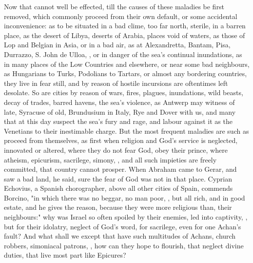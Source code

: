 Now that cannot well be effected, till the causes of these maladies be first
removed, which commonly proceed from their own default, or some accidental
inconvenience: as to be situated in a bad clime, too far north, sterile, in a
barren place, as the desert of Libya, deserts of Arabia, places void of waters,
as those of Lop and Belgian in Asia, or in a bad air, as at Alexandretta,
Bantam, Pisa, Durrazzo, S. John de Ulloa, \etc{}, or in danger of the sea's
continual inundations, as in many places of the Low Countries and elsewhere, or
near some bad neighbours, as Hungarians to Turks, Podolians to Tartars, or
almost any bordering countries, they live in fear still, and by reason of
hostile incursions are oftentimes left desolate. So are cities by reason
of wars, fires, plagues, inundations,
wild beasts, decay of trades, barred havens, the sea's
violence, as Antwerp may witness of late, Syracuse of old, Brundusium in Italy,
Rye and Dover with us, and many that at this day suspect the sea's fury and
rage, and labour against it as the Venetians to their inestimable charge. But
the most frequent maladies are such as proceed from themselves, as first when
religion and God's service is neglected, innovated or altered, where they do
not fear God, obey their prince, where atheism, epicurism, sacrilege, simony,
\etc{}, and all such impieties are freely committed, that country cannot
prosper. When Abraham came to Gerar, and saw a bad land, he said, sure the fear
of God was not in that place. Cyprian Echovius, a Spanish
chorographer, above all other cities of Spain, commends Borcino, "in which
there was no beggar, no man poor, \etc{}, but all rich, and in good estate, and
he gives the reason, because they were more religious than, their neighbours:"
why was Israel so often spoiled by their enemies, led into captivity, \etc{},
but for their idolatry, neglect of God's word, for sacrilege, even for one
Achan's fault? And what shall we except that have such multitudes of Achans,
church robbers, simoniacal patrons, \etc{}, how can they hope to flourish, that
neglect divine duties, that live most part like Epicures?


